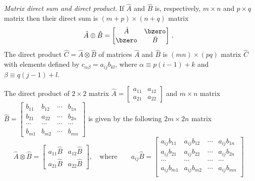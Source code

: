 %
\begin{unit}\textit{Matrix direct sum and direct product}.
If $\hat{A}$ and $\hat{B}$ is, respectively, $m\times n$ and
$p\times q$ matrix then their direct sum is $(m+p)\times (n+q)$
matrix
\[\hat{A}\oplus\hat{B}=
\begin{bmatrix}
\hat{A}&\bzero\\
\bzero&\hat{B}
\end{bmatrix}\,.\]
The direct product $\hat{C}=\hat{A}\otimes\hat{B}$ of matrices
$\hat{A}$ and $\hat{B}$ is $(mn)\times (pq)$ matrix $\hat{C}$ with
elements defined by $c_{\alpha\beta}=a_{ij}b_{kl}$, where
$\alpha\equiv p(i-1)+k$ and $\beta\equiv q(j-1)+l$.
\end{unit}
%
\begin{example}
The direct product of $2\times 2$ matrix
$\hat{A}=\left[\begin{smallmatrix}a_{11}&a_{12}\\a_{21}&a_{22}\end{smallmatrix}\right]$
and $m\times n$ matrix $\hat{B}=\left[\begin{smallmatrix}b_{11}&b_{12}&\cdots&b_{1n}\\
b_{21}&a_{22}&\cdots&b_{2n}\\
\cdots&\cdots&\cdots&\cdots\\
b_{m1}&b_{m2}&\cdots&b_{mn}
\end{smallmatrix}\right]$ is given by the following $2m\times 2n$ matrix
\[\hat{A}\otimes\hat{B}=
\begin{bmatrix}
a_{11}\hat{B}&a_{12}\hat{B}\\
a_{21}\hat{B}&a_{22}\hat{B}
\end{bmatrix}, \quad\textrm{where} \quad
\quad a_{ij}\hat{B}=\begin{bmatrix}
  a_{ij}b_{11}&a_{ij}b_{12}&\cdots&a_{ij}b_{1n}\\
a_{ij}b_{21}&a_{ij}b_{22}&\cdots&a_{ij}b_{2n}\\
  \cdots&\cdots&\cdots&\cdots\\
a_{ij}b_{m1}&a_{ij}b_{m2}&\cdots&a_{ij}b_{mn}\\
\end{bmatrix}\]
\end{example}
%
